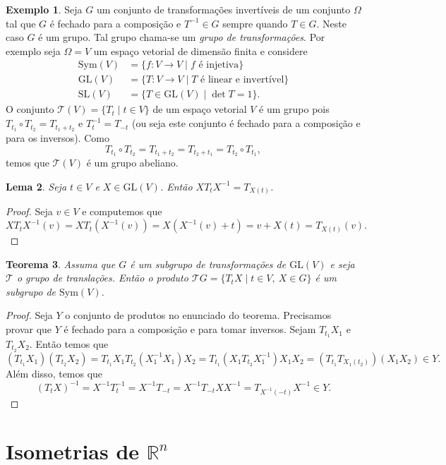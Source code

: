 \documentclass[12pt]{amsart}
\newcommand{\R}{\mathbb R}
\newcommand{\glv}[1]{\mbox{GL}(#1)}
\newcommand{\slv}[1]{\mbox{SL}(#1)}
\newcommand{\Sym}{\mbox{Sym}}
\newtheorem{theorem}{Teorema}
\newtheorem{lemma}[theorem]{Lema}
\theoremstyle{definition}
\newtheorem{example}[theorem]{Exemplo}
\begin{document}
\begin{example}
    Seja $G$ um conjunto de transformações invertíveis de um conjunto $\Omega$ tal que $G$ é fechado para 
    a composição e $T^{-1}\in G$ sempre quando $T\in G$. Neste caso $G$ é um grupo. Tal grupo chama-se 
    um \emph{grupo de transformações}. Por exemplo seja $\Omega=V$ um espaço vetorial de dimensão finita
    e considere 
    \begin{align*}
        \Sym(V)&=\{f:V\to V\mid f \mbox{ é injetiva}\}\\
        \glv V&=\{T:V\to V\mid \mbox{$T$ é linear e invertível}\}\\
        \slv V&=\{T\in \glv V\mid \det T=1\}.
    \end{align*}
    O conjunto $\mathcal T(V)=\{T_t\mid t\in V\}$ de um espaço vetorial $V$ é um grupo pois 
    $T_{t_1}\circ T_{t_2}=T_{t_1+t_2}$ e $T_{t}^{-1}=T_{-t}$ (ou seja este conjunto é fechado para  
    a composição e para os inversos). Como 
    \[
        T_{t_1}\circ T_{t_2}=T_{t_1+t_2}=T_{t_2+t_1}=T_{t_2}\circ T_{t_1},
    \]
    temos que $\mathcal T(V)$ é um grupo abeliano.
\end{example}

\begin{lemma}
    Seja $t\in V$ e $X\in \glv V$. Então $XT_tX^{-1}=T_{X(t)}$.  
\end{lemma}
\begin{proof}
    Seja $v\in V$ e computemos que 
    \[
        XT_tX^{-1}(v)=XT_t(X^{-1}(v))=X(X^{-1}(v)+t)=v+X(t)=T_{X(t)}(v).
    \]
\end{proof}

\begin{theorem}
    Assuma que $G$ é um subgrupo de transformações de $\glv V$ e seja $\mathcal T$ o grupo de translações. 
    Então o produto $\mathcal TG=\{T_tX\mid t\in V,\ X\in G\}$ é um subgrupo de $\Sym(V)$. 
\end{theorem}
\begin{proof}
    Seja $Y$ o conjunto de produtos no enunciado do teorema. Precisamos provar que $Y$ é fechado para 
    a composição e para tomar inversos. Sejam $T_{t_1}X_1$ e $T_{t_2}X_2$. Então temos que 
    \[
        (T_{t_1}X_{1})(T_{t_2}X_2)=T_{t_1}X_{1}T_{t_2}(X_1^{-1}X_1)X_2=
        T_{t_1}(X_{1}T_{t_2}X_1^{-1})X_1X_2=(T_{t_1}T_{X_1(t_2)})(X_1X_2)\in Y.
    \]  
    Além disso, temos que 
    \[
        (T_tX)^{-1}=X^{-1}T_t^{-1}=X^{-1}T_{-t}=X^{-1}T_{-t}XX^{-1}=T_{X^{-1}(-t)}X^{-1}\in Y.
    \]
\end{proof}
\section{Isometrias de $\R^n$}
\end{document}
